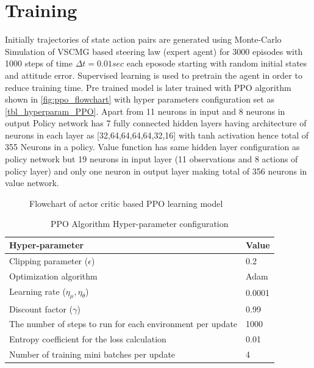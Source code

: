 \section{Training}
Initially trajectories of state action pairs are generated using Monte-Carlo Simulation of VSCMG based steering law (expert agent) for 3000 episodes with 1000 steps of time $\Delta t=0.01sec$ each eposode starting with random initial states and attitude error. Supervised learning is used to pretrain the agent in order to reduce training time. Pre trained model is later trained with PPO algorithm shown in \autoref{fig:ppo_flowchart} with hyper parameters configuration set as \autoref{tbl_hyperparam_PPO}. Apart from 11 neurons in input and 8 neurons in output Policy network has 7 fully connected hidden layers having architecture of neurons in each layer as [32,64,64,64,64,32,16] with tanh activation hence total of 355 Neurons in a policy. Value function has same hidden layer configuration as policy network but 19 neurons in input layer (11 observations and 8 actions of policy layer) and only one neuron in output layer making total of 356 neurons in value network.

\begin{figure}[H]
    \centering
    \scalebox{0.75}{}
    \caption{Flowchart of actor critic based PPO learning model \cite{LimHun_ppo_flowchart}}
    \label{fig:ppo_flowchart}
\end{figure}

\begin{table}[H]
\centering
        
\begin{tabular}{p{}|p{}}
\toprule
 Hyper-parameter & Value \\
\midrule
 Clipping parameter ($\displaystyle \epsilon $) & 0.2 \\
\hline 
 Optimization algorithm & Adam \\
\hline 
 Learning rate ($\displaystyle \eta _{\mu } ,\eta _{\theta }$) & 0.0001 \\
\hline 
 Discount factor ($\displaystyle \gamma $) & 0.99 \\
\hline 
 The number of steps to run for each environment per update & 1000 \\
\hline 
 Entropy coefficient for the loss calculation & 0.01 \\
\hline 
 Number of training mini batches per update & 4 \\
 \bottomrule
\end{tabular}
\caption{PPO Algorithm Hyper-parameter configuration}
\label{tbl_hyperparam_PPO}
\end{table}

